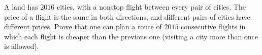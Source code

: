 A land has $2016$ cities, with a nonstop flight between every pair of cities. The price of a flight is the same in both directions, and different pairs of cities have different prices. Prove that one can plan a route of $2015$ consecutive flights in which each flight is cheaper than the previous one (visiting a city more than once is allowed).

